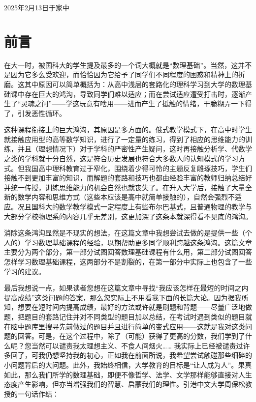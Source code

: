 \documentclass{ctexart}
\begin{document}
{\hfill 2025年2月13日\quad 于家中}

\section{前言}

在大一时，被国科大的学生提及最多的一个词大概就是“数理基础”。当然，这并不是因为它多么受欢迎，而恰恰因为它给予了同学们不同程度的困惑和精神上的折磨。这其中原因可以简单概括为：从高中浅层的套路化的理科学习到大学的数理基础课中存在巨大的鸿沟，导致同学们难以适应；而在尝试适应遭受打击时，逐渐产生了“灵魂之问”——学这玩意有啥用——进而产生了抵触的情绪，干脆糊弄一下得了，引发恶性循环。

这种课程衔接上的巨大鸿沟，其原因是多方面的。俄式教学模式下，在高中时学生就接触应用型的高等数学知识，进行了一定量的练习，得到了相应的思维能力的训练，并且（理想情况下）对于学科的严密性产生疑问，这时再接触分析学、代数学之类的学科就十分自然，这是符合历史发展也符合大多数人的认知模式的学习方式。但我国高中理科教育过于窄化，围绕着少得可怜的主题反复雕琢技巧，学生们接触不到更加丰富的知识，而解题的套路和技巧也都由经验丰富的教师归纳总结好并统一传授，训练思维能力的机会自然也就丧失了。在升入大学后，接触了大量全新的数学内容和思维方式（这些本应该是高中就简单接触的），自然会强烈不适应。况且国科大的数学教学模式一定程度上有些布尔巴基式，且普通物理的教学与大部分学校物理系的内容几乎无差别，这更加深了这条本就深得看不见底的鸿沟。

消除这条鸿沟显然是不现实的想法，在这篇文章中我想尝试去做的是提供一些（个人的）学习数理基础课程的经验，以期帮助更多同学顺利跨越这条鸿沟。这篇文章主要分为两个部分，第一部分试图回答数理基础课程有什么用，第二部分试图回答怎样学习数理基础课程，这两部分不是割裂的，在第一部分中实际上也包含了一些学习的建议。

最后我想说一点，如果读者您想在这篇文章中寻找“我应该怎样在最短的时间之内提高成绩”这类问题的答案，那么您实际上不用看我下面的长篇大论。因为据我所知，想要在短时间内提高成绩，最好的方法或许就是刷题和背题——尽量广泛地做题，把题目的套路记住并对不同类型的题目加以总结，在考试时遇到类似的题目就在脑中题库里搜寻先前做过的题目并且进行简单的变式应用——这就是我对这类问题的回答。可是，在这个过程中，除了（可能）获得了更高的分数，我们学到了什么呢？您当然可以谴责我太理想主义、不食人间烟火…… 我实际上已经被谴责过许多回了，可我仍想坚持我的初心，正如我在前面所说，我希望尝试触碰那些细碎的小问题背后的大问题。此外，我始终相信，大学教育的目标是“让人成为人”。果真如此，那么我们所学的数理基础，即便不像哲学、法学、文学那样能够直接对人生态度产生影响，但亦当增强我们的智慧、启蒙我们的理性。引港中文大学周保松教授的一句话作结：
\end{document}
